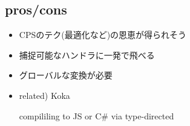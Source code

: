 \subsection*{pros/cons}
\begin{frame}
  \frametitlesubs

  \pause
  \begin{itemize}
    \item<+->[\coloremoji{😁}] CPSのテク(最適化など)の恩恵が得られそう
    \item<+->[\coloremoji{😁}] 捕捉可能なハンドラに一発で飛べる
    \item<+->[\coloremoji{😕}] グローバルな変換が必要
  \end{itemize}


  \begin{itemize}
    \item<+->[\coloremoji{⭐}] related)  Koka

      compililing to JS or C\# via type-directed ~\cite{leijen2016algebraic}
  \end{itemize}
\end{frame}
